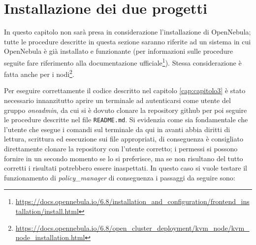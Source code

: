 \section{Installazione dei due progetti}
In questo capitolo non sarà presa in considerazione l'installazione di OpenNebula; tutte le procedure descritte in questa sezione saranno riferite ad un sistema in cui OpenNebula è già installato e funzionante (per informazioni sulle procedure seguite fare riferimento alla documentazione ufficiale\footnote{\url{https://docs.opennebula.io/6.8/installation\_and\_configuration/frontend\_installation/install.html}}). Stessa considerazione è fatta anche per i nodi\footnote{\url{https://docs.opennebula.io/6.8/open\_cluster\_deployment/kvm\_node/kvm\_node\_installation.html}}.\par
Per eseguire correttamente il codice descritto nel capitolo \ref{cap:capitolo3} è stato necessario innanzitutto aprire un terminale ad autenticarsi come utente del gruppo \emph{oneadmin}, da cui si è dovuto clonare la repository github per poi seguire le procedure descritte nel file \texttt{README.md}. Si evidenzia come sia fondamentale che l'utente che esegue i comandi sul terminale da qui in avanti abbia diritti di lettura, scrittura ed esecuzione sui file appropriati, di conseguenza è consigliato direttamente clonare la repository con l'utente corretto; i permessi si possono fornire in un secondo momento se lo si preferisce, ma se non risultano del tutto corretti i risultati potrebbero essere inaspettati.
In questo caso si vuole testare il funzionamento di \emph{policy\_manager} di conseguenza i passaggi da seguire sono:
